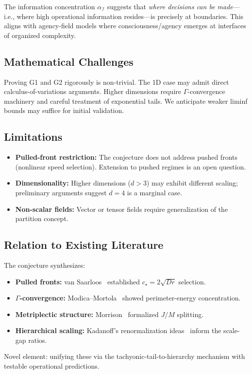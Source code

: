 \documentclass{article}
\begin{document}
The information concentration $\alpha_\mathcal{I}$ suggests that \emph{where decisions can be made}—i.e., where high operational information resides—is precisely at boundaries. This aligns with agency-field models where consciousness/agency emerges at interfaces of organized complexity.

\subsection{Mathematical Challenges}

Proving G1 and G2 rigorously is non-trivial. The 1D case may admit direct calculus-of-variations arguments. Higher dimensions require $\Gamma$-convergence machinery and careful treatment of exponential tails. We anticipate weaker liminf bounds may suffice for initial validation.

\subsection{Limitations}

\begin{itemize}
    \item \textbf{Pulled-front restriction:} The conjecture does not address pushed fronts (nonlinear speed selection). Extension to pushed regimes is an open question.
    \item \textbf{Dimensionality:} Higher dimensions ($d>3$) may exhibit different scaling; preliminary arguments suggest $d=4$ is a marginal case.
    \item \textbf{Non-scalar fields:} Vector or tensor fields require generalization of the partition concept.
\end{itemize}

\subsection{Relation to Existing Literature}

The conjecture synthesizes:
\begin{itemize}
    \item \textbf{Pulled fronts:} van Saarloos~\cite{vanSaarloos2003} established $c_\star=2\sqrt{Dr}$ selection.
    \item \textbf{$\Gamma$-convergence:} Modica--Mortola~\cite{ModicaMortola1977} showed perimeter-energy concentration.
    \item \textbf{Metriplectic structure:} Morrison~\cite{Morrison1986} formalized $J/M$ splitting.
    \item \textbf{Hierarchical scaling:} Kadanoff's renormalization ideas~\cite{Kadanoff1966} inform the scale-gap ratios.
\end{itemize}
Novel element: unifying these via the tachyonic-tail-to-hierarchy mechanism with testable operational predictions.
\end{document}
